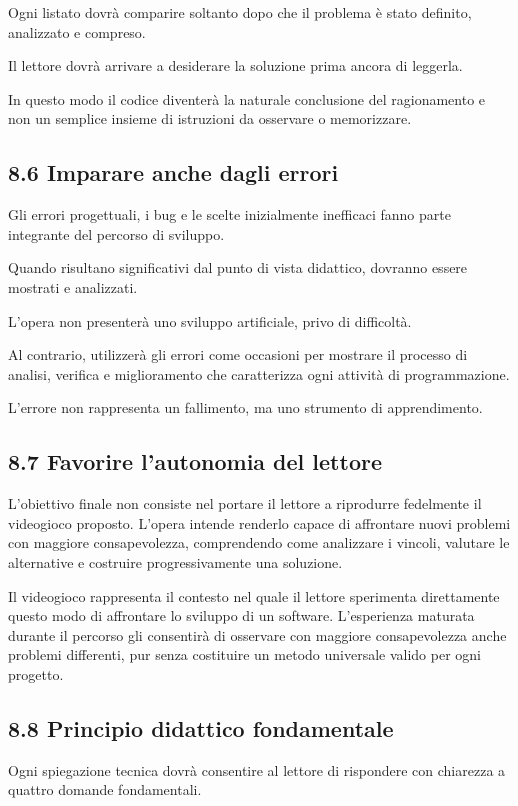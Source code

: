 \documentclass{article}
\begin{document}
Ogni listato dovrà comparire soltanto dopo che il problema è stato definito, analizzato e compreso.

Il lettore dovrà arrivare a desiderare la soluzione prima ancora di leggerla.

In questo modo il codice diventerà la naturale conclusione del ragionamento e non un semplice insieme di istruzioni da
osservare o memorizzare.

\subsection{8.6 Imparare anche dagli errori}
Gli errori progettuali, i bug e le scelte inizialmente inefficaci fanno parte integrante del percorso di sviluppo.

Quando risultano significativi dal punto di vista didattico, dovranno essere mostrati e analizzati.

L'opera non presenterà uno sviluppo artificiale, privo di difficoltà.

Al contrario, utilizzerà gli errori come occasioni per mostrare il processo di analisi, verifica e miglioramento che
caratterizza ogni attività di programmazione.

L'errore non rappresenta un fallimento, ma uno strumento di apprendimento.

\subsection[8.7 Favorire l{}'autonomia del lettore]{8.7 Favorire l'autonomia del lettore}
L'obiettivo finale non consiste nel portare il lettore a riprodurre fedelmente il videogioco proposto. L'opera intende
renderlo capace di affrontare nuovi problemi con maggiore consapevolezza, comprendendo come analizzare i vincoli,
valutare le alternative e costruire progressivamente una soluzione.

Il videogioco rappresenta il contesto nel quale il lettore sperimenta direttamente questo modo di affrontare lo sviluppo
di un software. L'esperienza maturata durante il percorso gli consentirà di osservare con maggiore consapevolezza anche
problemi differenti, pur senza costituire un metodo universale valido per ogni progetto.

\subsection{8.8 Principio didattico fondamentale}
Ogni spiegazione tecnica dovrà consentire al lettore di rispondere con chiarezza a quattro domande fondamentali.
\end{document}
